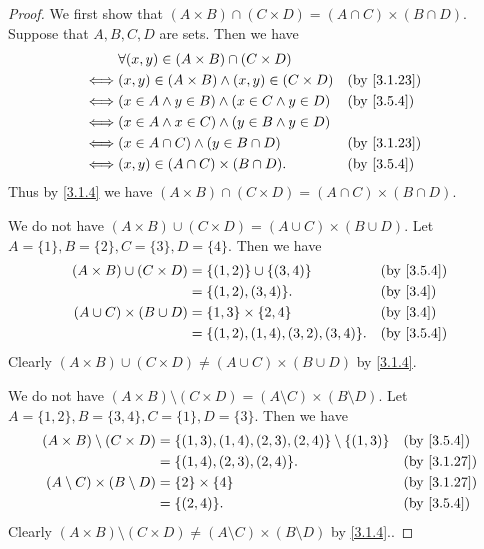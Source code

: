 \begin{proof}
  We first show that \((A \times B) \cap (C \times D) = (A \cap C) \times (B \cap D)\).
  Suppose that \(A, B, C, D\) are sets.
  Then we have
  \begin{align*}
         & \forall (x, y) \in (A \times B) \cap (C \times D)                                    \\
    \iff & (x, y) \in (A \times B) \land (x, y) \in (C \times D) &  & \text{(by \cref{3.1.23})} \\
    \iff & (x \in A \land y \in B) \land (x \in C \land y \in D) &  & \by{3.5.4}                \\
    \iff & (x \in A \land x \in C) \land (y \in B \land y \in D)                                \\
    \iff & (x \in A \cap C) \land (y \in B \cap D)               &  & \text{(by \cref{3.1.23})} \\
    \iff & (x, y) \in (A \cap C) \times (B \cap D).              &  & \by{3.5.4}
  \end{align*}
  Thus by \cref{3.1.4} we have \((A \times B) \cap (C \times D) = (A \cap C) \times (B \cap D)\).

  We do not have \((A \times B) \cup (C \times D) = (A \cup C) \times (B \cup D)\).
  Let \(A = \{1\}, B = \{2\}, C = \{3\}, D = \{4\}\).
  Then we have
  \begin{align*}
    (A \times B) \cup (C \times D) & = \{(1, 2)\} \cup \{(3, 4)\}          &  & \by{3.5.4}             \\
                                   & = \{(1, 2), (3, 4)\}.                 &  & \text{(by \cref{3.4})} \\
    (A \cup C) \times (B \cup D)   & = \{1, 3\} \times \{2, 4\}            &  & \text{(by \cref{3.4})} \\
                                   & = \{(1, 2), (1, 4), (3, 2), (3, 4)\}. &  & \by{3.5.4}
  \end{align*}
  Clearly \((A \times B) \cup (C \times D) \neq (A \cup C) \times (B \cup D)\) by \cref{3.1.4}.

  We do not have \((A \times B) \setminus (C \times D) = (A \setminus C) \times (B \setminus D)\).
  Let \(A = \{1, 2\}, B = \{3, 4\}, C = \{1\}, D = \{3\}\).
  Then we have
  \begin{align*}
    (A \times B) \setminus (C \times D)    & = \{(1, 3), (1, 4), (2, 3), (2, 4)\} \setminus \{(1, 3)\} &  & \by{3.5.4}                \\
                                           & = \{(1, 4), (2, 3), (2, 4)\}.                             &  & \text{(by \cref{3.1.27})} \\
    (A \setminus C) \times (B \setminus D) & = \{2\} \times \{4\}                                      &  & \text{(by \cref{3.1.27})} \\
                                           & = \{(2, 4)\}.                                             &  & \by{3.5.4}
  \end{align*}
  Clearly \((A \times B) \setminus (C \times D) \neq (A \setminus C) \times (B \setminus D)\) by \cref{3.1.4}..
\end{proof}

